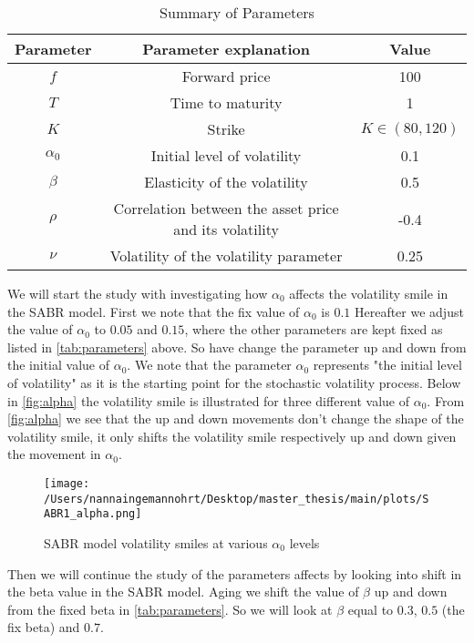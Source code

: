 \begin{table}[H]
    \centering
    \begin{tabular}{ccc}
      \toprule
      \textbf{Parameter} & \textbf{Parameter explanation} & \textbf{Value} \\
      \midrule
      $f$ & Forward price & 100 \\
      $T$ & Time to maturity & 1 \\
      $K$ & Strike & $K \in (80,120)$ \\
      $\alpha_0$ & Initial level of volatility & 0.1 \\
      $\beta$ & Elasticity of the volatility & 0.5 \\
      $\rho$ & Correlation between the asset price and its volatility & -0.4 \\
      $\nu$ & Volatility of the volatility parameter & 0.25 \\
      \bottomrule
    \end{tabular}
    \caption{Summary of Parameters}
    \label{tab:parameters}
\end{table}
\noindent
We will start the study with investigating how $\alpha_0$ affects the volatility smile in the SABR model. 
First we note that the fix value of $\alpha_0$ is $0.1$ Hereafter we adjust the value of $\alpha_0$ to $0.05$ and $0.15$,
where the other parameters are kept fixed as listed in \autoref{tab:parameters} above. So have change the parameter
up and down from the initial value of $\alpha_0$.
We note that the parameter $\alpha_0$
represents "the initial level of volatility" as it is the starting point for the stochastic volatility process. 
Below in \autoref{fig:alpha} the volatility smile is illustrated for three different value of $\alpha_0$. 
From \autoref{fig:alpha} we see that the up and down movements don't change the shape of the volatility smile, 
it only shifts the volatility smile respectively up and down given the movement in $\alpha_0$.
\begin{figure}[H]
    \centering
    \texttt{[image: /Users/nannaingemannohrt/Desktop/master\_thesis/main/plots/SABR1\_alpha.png]}
    \caption{SABR model volatility smiles at various $\alpha_0$ levels}
    \label{fig:alpha}
\end{figure}
\noindent
Then we will continue the study of the parameters affects by looking into shift in the beta value in the SABR model.
Aging we shift the value of $\beta$ up and down from the fixed beta in \autoref{tab:parameters}. So we will look at $\beta$ equal to $0.3$,
$0.5$ (the fix beta) and $0.7$. 
